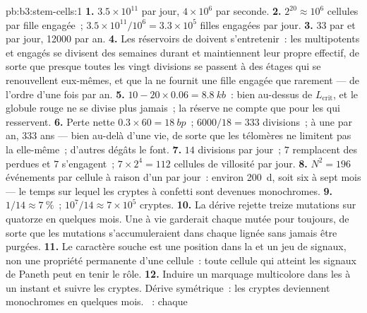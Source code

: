 \begin{solution}{pb:b3:stem-cells:1}
\textbf{1.} $3.5\times 10^{11}$ par jour, $4\times 10^{6}$ par seconde.
\textbf{2.} $2^{20} \approx 10^{6}$ cellules par fille engagée~;
$3.5\times 10^{11}/10^{6} = 3.3\times 10^{5}$ filles engagées par jour.
\textbf{3.} $33$ par  et par jour, \num{12000} par an.
\textbf{4.} Les réservoirs de  doivent s'entretenir~: les
 multipotents et engagés se divisent des semaines durant et
maintiennent leur propre effectif, de sorte que presque toutes les vingt
divisions se passent à des étages qui se renouvellent eux-mêmes, et que
la  ne fournit une fille engagée que rarement --- de
l'ordre d'une fois par an.
\textbf{5.} $10 - 20\times 0.06 = \qty{8.8}{kb}$~: bien au-dessus de
$L_{\text{crit}}$, et le globule rouge ne se divise plus jamais~; la
réserve ne compte que pour les  qui resservent.
\textbf{6.} Perte nette $0.3\times 60 = \qty{18}{bp}$~; $6000/18 = 333$
divisions~; à une par an, $333$ ans --- bien au-delà d'une vie, de sorte
que les télomères ne limitent pas la  elle-même~; d'autres
dégâts le font.
\textbf{7.} $14$ divisions par jour~; $7$ remplacent des 
perdues et $7$ s'engagent~; $7\times 2^{4} = 112$ cellules de villosité
par jour.
\textbf{8.} $N^{2} = 196$ événements par cellule à raison d'un par jour~:
environ \qty{200}{d}, soit six à sept mois --- le temps sur lequel
les cryptes à confetti sont devenues monochromes.
\textbf{9.} $1/14 \approx \qty{7}{\%}$~; $10^{7}/14 \approx 7\times 10^{5}$
cryptes.
\textbf{10.} La dérive rejette treize mutations sur quatorze en quelques
mois. Une  à vie garderait chaque 
mutée pour toujours, de sorte que les mutations s'accumuleraient dans
chaque lignée sans jamais être purgées.
\textbf{11.} Le caractère souche est une position dans la  et un
jeu de signaux, non une propriété permanente d'une cellule~: toute
cellule qui atteint les signaux de Paneth peut en tenir le rôle.
\textbf{12.} Induire un marquage multicolore dans les  à
un instant et suivre les cryptes. Dérive symétrique~: les cryptes
deviennent monochromes en quelques mois. ~: chaque

\end{solution}
